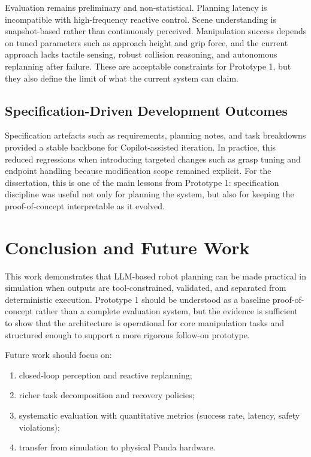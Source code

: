 \documentclass[12pt,a4paper]{article}
\begin{document}
Evaluation remains preliminary and non-statistical. Planning latency is incompatible with high-frequency reactive control. Scene understanding is snapshot-based rather than continuously perceived. Manipulation success depends on tuned parameters such as approach height and grip force, and the current approach lacks tactile sensing, robust collision reasoning, and autonomous replanning after failure. These are acceptable constraints for Prototype 1, but they also define the limit of what the current system can claim.

\subsection{Specification-Driven Development Outcomes}

Specification artefacts such as requirements, planning notes, and task breakdowns provided a stable backbone for Copilot-assisted iteration. In practice, this reduced regressions when introducing targeted changes such as grasp tuning and endpoint handling because modification scope remained explicit. For the dissertation, this is one of the main lessons from Prototype 1: specification discipline was useful not only for planning the system, but also for keeping the proof-of-concept interpretable as it evolved.

\section{Conclusion and Future Work}

This work demonstrates that LLM-based robot planning can be made practical in simulation when outputs are tool-constrained, validated, and separated from deterministic execution. Prototype 1 should be understood as a baseline proof-of-concept rather than a complete evaluation system, but the evidence is sufficient to show that the architecture is operational for core manipulation tasks and structured enough to support a more rigorous follow-on prototype.

Future work should focus on:
\begin{enumerate}
\item closed-loop perception and reactive replanning;
\item richer task decomposition and recovery policies;
\item systematic evaluation with quantitative metrics (success rate, latency, safety violations);
\item transfer from simulation to physical Panda hardware.
\end{enumerate}
\end{document}
